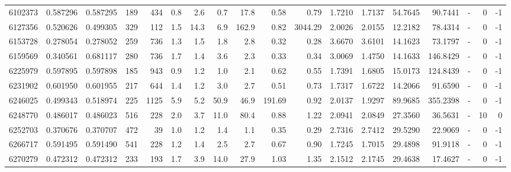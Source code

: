 \begin{tabular}{rrrrrrrrrrrrrrrlrr}
   6102373 & 0.587296 &   0.587295 &  189 &  434 &      0.8 &      2.6 &     0.7 &     17.8 &       0.58 &        0.79 &  1.7210 &  1.7137 &   54.7645 &   90.7441 &             - &        0 &         -1 \\
   6127356 & 0.520626 &   0.499305 &  329 &  112 &      1.5 &     14.3 &     6.9 &    162.9 &       0.82 &     3044.29 &  2.0026 &  2.0155 &   12.2182 &   78.4314 &             - &        0 &         -1 \\
   6153728 & 0.278054 &   0.278052 &  259 &  736 &      1.3 &      1.5 &     1.8 &      2.8 &       0.32 &        0.28 &  3.6670 &  3.6101 &   14.1623 &   73.1797 &             - &        0 &         -1 \\
   6159569 & 0.340561 &   0.681117 &  280 &  736 &      1.7 &      1.4 &     3.6 &      2.3 &       0.33 &        0.34 &  3.0069 &  1.4750 &   14.1633 &  146.8429 &             - &        0 &         -1 \\
   6225979 & 0.597895 &   0.597898 &  185 &  943 &      0.9 &      1.2 &     1.0 &      2.1 &       0.62 &        0.55 &  1.7391 &  1.6805 &   15.0173 &  124.8439 &             - &        0 &         -1 \\
   6231902 & 0.601950 &   0.601955 &  217 &  644 &      1.4 &      1.2 &     3.0 &      2.7 &       0.51 &        0.73 &  1.7317 &  1.6722 &   14.2066 &   91.6590 &             - &        0 &         -1 \\
   6246025 & 0.499343 &   0.518974 &  225 & 1125 &      5.9 &      5.2 &    50.9 &     46.9 &     191.69 &        0.92 &  2.0137 &  1.9297 &   89.9685 &  355.2398 &             - &        0 &         -1 \\
   6248770 & 0.486017 &   0.486023 &  516 &  228 &      2.0 &      3.7 &    11.0 &     80.4 &       0.88 &        1.22 &  2.0941 &  2.0849 &   27.3560 &   36.5631 &             - &       10 &          0 \\
   6252703 & 0.370676 &   0.370707 &  472 &   39 &      1.0 &      1.2 &     1.4 &      1.1 &       0.35 &        0.29 &  2.7316 &  2.7412 &   29.5290 &   22.9069 &             - &        0 &         -1 \\
   6266717 & 0.591495 &   0.591490 &  541 &  228 &      1.2 &      1.4 &     2.5 &      2.7 &       0.67 &        0.90 &  1.7245 &  1.7015 &   29.4898 &   91.9118 &             - &        0 &         -1 \\
   6270279 & 0.472312 &   0.472312 &  233 &  193 &      1.7 &      3.9 &    14.0 &     27.9 &       1.03 &        1.35 &  2.1512 &  2.1745 &   29.4638 &   17.4627 &             - &        0 &         -1 \\

\end{tabular}
